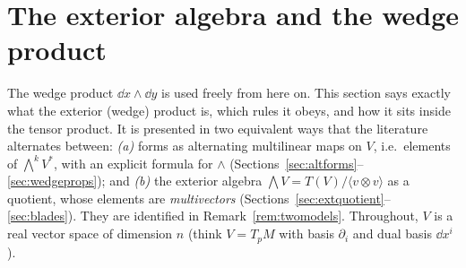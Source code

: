 \section{The exterior algebra and the wedge product}\label{sec:ext}

The wedge product $\dd x\wedge\dd y$ is used freely from here on. This section says exactly what the exterior (wedge) product
is, which rules it obeys, and how it sits inside the tensor product. It is presented in two equivalent ways that the literature
alternates between: \emph{(a)} forms as alternating multilinear maps on $V$, i.e.\ elements of $\bigwedge^kV^*$, with an explicit
formula for $\wedge$ (Sections~\ref{sec:altforms}--\ref{sec:wedgeprops}); and \emph{(b)} the exterior algebra
$\bigwedge V=T(V)/\langle v\otimes v\rangle$ as a quotient, whose elements are \emph{multivectors}
(Sections~\ref{sec:extquotient}--\ref{sec:blades}). They are identified in Remark~\ref{rem:twomodels}. Throughout, $V$ is a real
vector space of dimension $n$ (think $V=T_pM$ with basis $\partial_i$ and dual basis $\dd x^i$).







